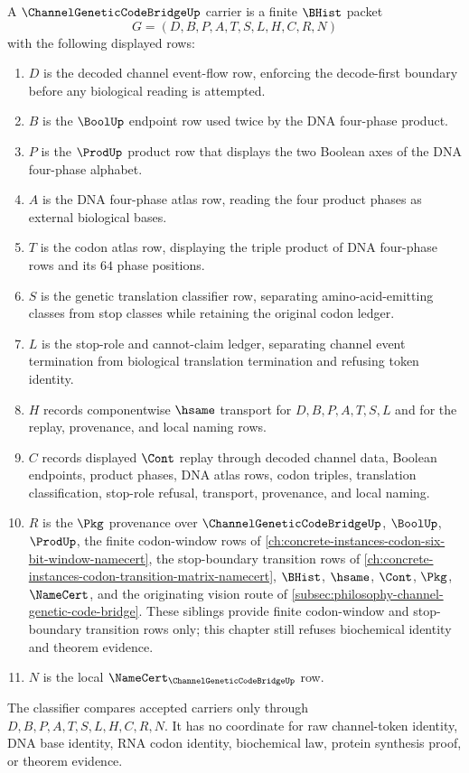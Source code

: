 \begin{definition}
\label{def:channel-genetic-code-bridge-carrier}
A $\ChannelGeneticCodeBridgeUp$ carrier is a finite $\BHist$ packet
$$
G=(D,B,P,A,T,S,L,H,C,R,N)
$$
with the following displayed rows:
\begin{enumerate}
\item $D$ is the decoded channel event-flow row, enforcing the decode-first boundary before any biological reading is attempted.
\item $B$ is the $\BoolUp$ endpoint row used twice by the DNA four-phase product.
\item $P$ is the $\ProdUp$ product row that displays the two Boolean axes of the DNA four-phase alphabet.
\item $A$ is the DNA four-phase atlas row, reading the four product phases as external biological bases.
\item $T$ is the codon atlas row, displaying the triple product of DNA four-phase rows and its $64$ phase positions.
\item $S$ is the genetic translation classifier row, separating amino-acid-emitting classes from stop classes while retaining the original codon ledger.
\item $L$ is the stop-role and cannot-claim ledger, separating channel event termination from biological translation termination and refusing token identity.
\item $H$ records componentwise $\hsame$ transport for $D,B,P,A,T,S,L$ and for the replay, provenance, and local naming rows.
\item $C$ records displayed $\Cont$ replay through decoded channel data, Boolean endpoints, product phases, DNA atlas rows, codon triples, translation classification, stop-role refusal, transport, provenance, and local naming.
\item $R$ is the $\Pkg$ provenance over $\ChannelGeneticCodeBridgeUp$, $\BoolUp$, $\ProdUp$, the finite codon-window rows of \autoref{ch:concrete-instances-codon-six-bit-window-namecert}, the stop-boundary transition rows of \autoref{ch:concrete-instances-codon-transition-matrix-namecert}, $\BHist$, $\hsame$, $\Cont$, $\Pkg$, $\NameCert$, and the originating vision route of \autoref{subsec:philosophy-channel-genetic-code-bridge}. These siblings provide finite codon-window and stop-boundary transition rows only; this chapter still refuses biochemical identity and theorem evidence.
\item $N$ is the local $\NameCert_{\ChannelGeneticCodeBridgeUp}$ row.
\end{enumerate}
The classifier compares accepted carriers only through $D,B,P,A,T,S,L,H,C,R,N$. It has no coordinate for raw channel-token identity, DNA base identity, RNA codon identity, biochemical law, protein synthesis proof, or theorem evidence.
\end{definition}

